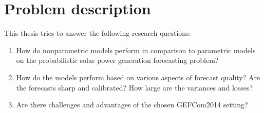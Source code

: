 \section{Problem description}
\label{sec:problem-description}

This thesis tries to answer the following research questions:
\begin{enumerate}
    \item How do nonparametric models perform in comparison to parametric models 
    on the probabilistic solar power generation forecasting problem?
    \item How do the models perform based on various aspects of forecast 
    quality? Are the forecasts sharp and calibrated? How large are the variances and losses?
    \item Are there challenges and advantages of the chosen GEFCom2014 setting?
\end{enumerate}